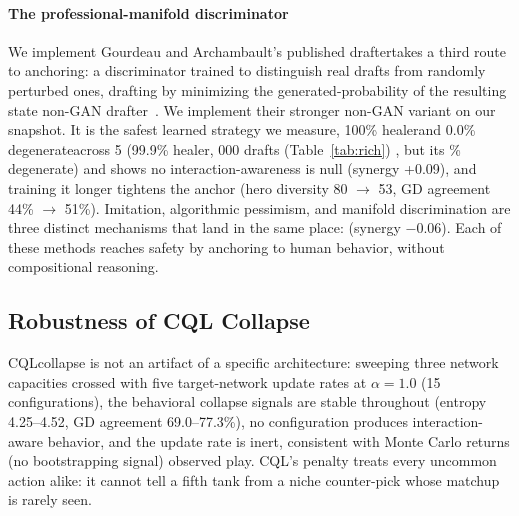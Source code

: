 \documentclass[journal]{IEEEtran}
\providecommand{\DIFaddtex}[1]{{\protect\color{blue} \sf #1}} %
\providecommand{\DIFdeltex}[1]{{\protect\color{red} \scriptsize #1}} %
\providecommand{\DIFaddbegin}{} %
\providecommand{\DIFaddend}{} %
\providecommand{\DIFdelbegin}{} %
\providecommand{\DIFdelend}{} %
\providecommand{\DIFadd}[1]{\texorpdfstring{\DIFaddtex{#1}}{#1}} %
\providecommand{\DIFdel}[1]{\texorpdfstring{\DIFdeltex{#1}}{}} %
\begin{document}
\DIFdelend \DIFaddbegin \paragraph{\DIFadd{The professional-manifold discriminator}} \DIFadd{We implement }\DIFaddend Gourdeau and Archambault's \DIFdelbegin \DIFdel{published draftertakes a third route to anchoring: a discriminator trained to distinguish real drafts from randomly perturbed ones, drafting by minimizing the generated-probability of the resulting state}\DIFdelend \DIFaddbegin \DIFadd{non-GAN drafter}\DIFaddend ~\cite{gourdeau2021discriminative}. \DIFdelbegin \DIFdel{We implement their stronger non-GAN variant on our snapshot. }\DIFdelend It is the safest learned strategy \DIFdelbegin \DIFdel{we measure, 100\% healerand 0.0\% degenerateacross 5}%
\DIFdelend \DIFaddbegin \DIFadd{(99.9\% healer}\DIFaddend , \DIFdelbegin %
\DIFdel{000 drafts (Table~\ref{tab:rich}) , but its }\DIFdelend \DIFaddbegin \DIFadd{0.3\% degenerate) and shows no }\DIFaddend interaction-awareness \DIFdelbegin \DIFdel{is null (synergy +0.09), and training it longer tightens the anchor (hero diversity 80 $\to$ 53, GD agreement 44\% $\to$ 51\%). Imitation, algorithmic pessimism, and manifold discrimination are three distinct mechanisms that land in the same place: }\DIFdelend \DIFaddbegin \DIFadd{(synergy $-$0.06). Each of these methods reaches }\DIFaddend safety by anchoring to \DIFdelbegin \DIFdel{human behavior, without compositional reasoning. }%

\subsection{\DIFdel{Robustness of CQL Collapse}}
\addtocounter{subsection}{-1}%

\DIFdel{CQLcollapse is not an artifact of a specific architecture: sweeping three network capacities crossed with five target-network update rates at $\alpha = 1.0$ (15 configurations), the behavioral collapse signals are stable throughout (entropy 4.25--4.52, GD agreement 69.0--77.3\%), no configuration produces interaction-aware behavior, and the update rate is inert, consistent with Monte Carlo returns (no bootstrapping signal)}\DIFdelend \DIFaddbegin \DIFadd{observed play. CQL's penalty treats every uncommon action alike: it cannot tell a fifth tank from a niche counter-pick whose matchup is rarely seen}\DIFaddend .
\end{document}
